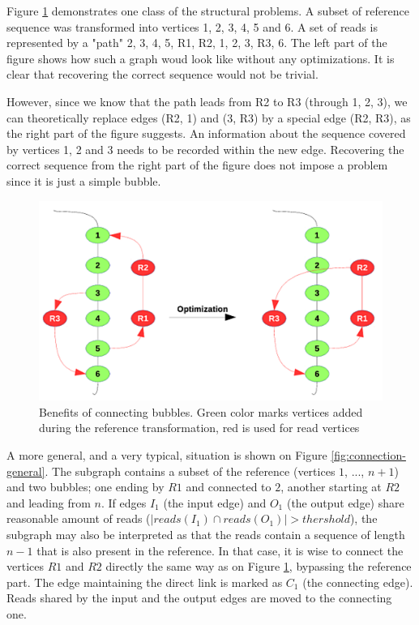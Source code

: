 Figure \ref{fig:bubble-connection} demonstrates one class of the structural problems. A subset of reference sequence was transformed into vertices 1, 2, 3, 4, 5 and 6. A set of reads is represented by a "path" 2, 3, 4, 5, R1, R2, 1, 2, 3, R3, 6.  The left part of the figure shows how such a graph woud look like without any optimizations. It is clear that recovering the correct sequence would not be trivial. 

However, since we know that the path leads from R2 to R3 (through 1, 2, 3), we can theoretically replace edges (R2, 1) and (3, R3) by a special edge (R2, R3), as the right part of the figure suggests. An information about the sequence covered by vertices 1, 2 and 3 needs to be recorded within the new edge. Recovering the correct sequence from the right part of the figure does not impose a problem since it is just a simple bubble. 

\begin{figure}
	\centering
	\includegraphics{img/bubble-connection.pdf}
	\caption{Benefits of connecting bubbles. Green color marks vertices added during the reference transformation, red is used for read vertices}
	\label{fig:bubble-connection}
\end{figure}

A more general, and a very typical, situation is shown on Figure \ref{fig:connection-general}. The subgraph contains a subset of the reference (vertices $1$, $...$, $n+1$) and two bubbles; one ending by $R1$ and connected to $2$, another starting at $R2$ and leading from $n$. If edges $I_1$ (the input edge) and $O_1$ (the output edge) share reasonable amount of reads ($|reads(I_1) \cap reads(O_1)| > thershold$), the subgraph may also be interpreted as that the reads contain a sequence of length $n-1$ that is also present in the reference. In that case, it is wise to connect the vertices $R1$ and $R2$ directly the same way as on Figure \ref{fig:bubble-connection}, bypassing the reference part. The edge maintaining the direct link is marked as $C_1$ (the connecting edge). Reads shared by the input and the output edges are moved to the connecting one.

